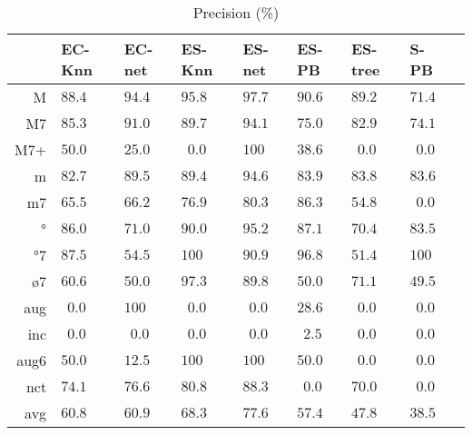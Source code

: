 \documentclass{article}
\begin{document}
\begin{table}
  \centering
\begin{tabular}{r|p{0.5cm}p{0.5cm}p{0.5cm}p{0.5cm}p{0.5cm}p{0.5cm}p{0.5cm}p{0.5cm}}
     &   EC-Knn &   EC-net &   ES-Knn &   ES-net &    ES-PB &  ES-tree &   S-PB \\ \hline
   M & $  88.4$ & $  94.4$ & $  95.8$ & $  97.7$ & $  90.6$ & $  89.2$ & $  71.4$ \\
  M7 & $  85.3$ & $  91.0$ & $  89.7$ & $  94.1$ & $  75.0$ & $  82.9$ & $  74.1$ \\
 M7+ & $  50.0$ & $  25.0$ & $ ~~0.0$ & $ 100  $ & $  38.6$ & $ ~~0.0$ & $ ~~0.0$ \\
   m & $  82.7$ & $  89.5$ & $  89.4$ & $  94.6$ & $  83.9$ & $  83.8$ & $  83.6$ \\
  m7 & $  65.5$ & $  66.2$ & $  76.9$ & $  80.3$ & $  86.3$ & $  54.8$ & $ ~~0.0$ \\
  °  & $  86.0$ & $  71.0$ & $  90.0$ & $  95.2$ & $  87.1$ & $  70.4$ & $  83.5$ \\
 °7  & $  87.5$ & $  54.5$ & $ 100$   & $  90.9$ & $  96.8$ & $  51.4$ & $ 100$ \\
 ø7  & $  60.6$ & $  50.0$ & $  97.3$ & $  89.8$ & $  50.0$ & $  71.1$ & $  49.5$ \\
 aug & $ ~~0.0$ & $ 100  $ & $ ~~0.0$ & $ ~~0.0$ & $  28.6$ & $ ~~0.0$ & $ ~~0.0$ \\
 inc & $ ~~0.0$ & $ ~~0.0$ & $ ~~0.0$ & $ ~~0.0$ & $ ~~2.5$ & $ ~~0.0$ & $ ~~0.0$ \\
aug6 & $  50.0$ & $  12.5$ & $ 100  $ & $ 100  $ & $  50.0$ & $ ~~0.0$ & $ ~~0.0$ \\
 nct & $  74.1$ & $  76.6$ & $  80.8$ & $  88.3$ & $ ~~0.0$ & $  70.0$ & $ ~~0.0$ \\
\hline                                                       
avg & $   60.8$ & $  60.9$ & $  68.3$ & $  77.6$ & $  57.4$ & $  47.8$ & $  38.5$ \\
\end{tabular}


  \caption{Precision (\%)}
  \label{tab:precision}
\end{table}
\end{document}
